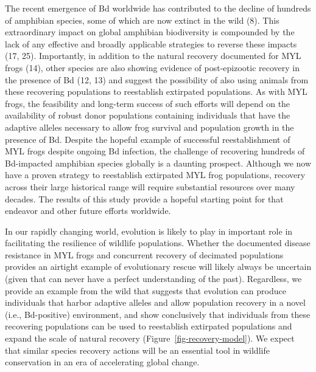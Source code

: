 \documentclass[9pt,twocolumn,twoside,lineno]{pnas-new}
\begin{document}
The recent emergence of Bd worldwide has contributed to the decline of
hundreds of amphibian species, some of which are now extinct in the wild
(8). This extraordinary impact on global amphibian biodiversity is
compounded by the lack of any effective and broadly applicable
strategies to reverse these impacts (17, 25). Importantly, in addition
to the natural recovery documented for MYL frogs (14), other species are
also showing evidence of post-epizootic recovery in the presence of Bd
(12, 13) and suggest the possibility of also using animals from these
recovering populations to reestablish extirpated populations. As with
MYL frogs, the feasibility and long-term success of such efforts will
depend on the availability of robust donor populations containing
individuals that have the adaptive alleles necessary to allow frog
survival and population growth in the presence of Bd. Despite the
hopeful example of successful reestablishment of MYL frogs despite
ongoing Bd infection, the challenge of recovering hundreds of
Bd-impacted amphibian species globally is a daunting prospect. Although
we now have a proven strategy to reestablish extirpated MYL frog
populations, recovery across their large historical range will require
substantial resources over many decades. The results of this study
provide a hopeful starting point for that endeavor and other future
efforts worldwide.

In our rapidly changing world, evolution is likely to play in important
role in facilitating the resilience of wildlife populations. Whether the
documented disease resistance in MYL frogs and concurrent recovery of
decimated populations provides an airtight example of evolutionary
rescue will likely always be uncertain (given that can never have a
perfect understanding of the past). Regardless, we provide an example
from the wild that suggests that evolution can produce individuals that
harbor adaptive alleles and allow population recovery in a novel (i.e.,
Bd-positive) environment, and show conclusively that individuals from
these recovering populations can be used to reestablish extirpated
populations and expand the scale of natural recovery
(Figure~\ref{fig-recovery-model}). We expect that similar species
recovery actions will be an essential tool in wildlife conservation in
an era of accelerating global change.
\end{document}
